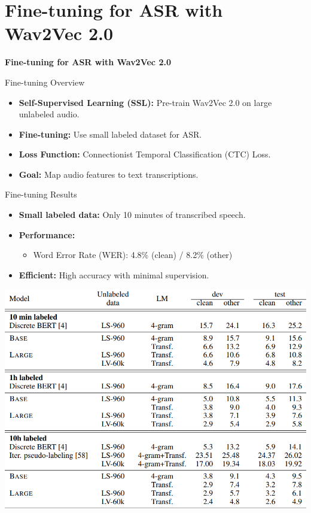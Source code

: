 \section{Fine-tuning for ASR with Wav2Vec 2.0}

\begin{frame}{}
    \LARGE \textbf{Fine-tuning for ASR with Wav2Vec 2.0}
\end{frame}

\begin{frame}{Fine-tuning Overview}
    \begin{itemize}
        \item \textbf{Self-Supervised Learning (SSL):} Pre-train Wav2Vec 2.0 on large unlabeled audio.
        \item \textbf{Fine-tuning:} Use small labeled dataset for ASR.
        \item \textbf{Loss Function:} Connectionist Temporal Classification (CTC) Loss.
        \item \textbf{Goal:} Map audio features to text transcriptions.
    \end{itemize}
\end{frame}

\begin{frame}[allowframebreaks]{Fine-tuning Results}
    \begin{itemize}
        \item \textbf{Small labeled data:} Only 10 minutes of transcribed speech.
        \item \textbf{Performance:}
        \begin{itemize}
            \item Word Error Rate (WER): 4.8\% (clean) / 8.2\% (other)
        \end{itemize}
        \item \textbf{Efficient:} High accuracy with minimal supervision.
    \end{itemize}
\framebreak
    \begin{center}
        \includegraphics[width=\textwidth,height=0.9\textheight,keepaspectratio]{images/audio-nlp/wav2vec2-wer-results.png}
    \end{center}
\end{frame}

